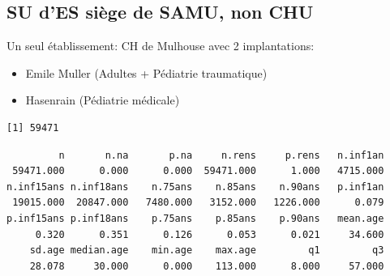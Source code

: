 \documentclass[]{article}
\newenvironment{Shaded}{\begin{snugshade}}{\end{snugshade}}
\newcommand{\KeywordTok}[1]{\textcolor[rgb]{0.13,0.29,0.53}{\textbf{{#1}}}}
\newcommand{\StringTok}[1]{\textcolor[rgb]{0.31,0.60,0.02}{{#1}}}
\newcommand{\CommentTok}[1]{\textcolor[rgb]{0.56,0.35,0.01}{\textit{{#1}}}}
\newcommand{\NormalTok}[1]{{#1}}
\begin{document}
\subsection{SU d'ES siège de SAMU, non
CHU}\label{su-des-siege-de-samu-non-chu}

Un seul établissement: CH de Mulhouse avec 2 implantations:

\begin{itemize}
\itemsep1pt\parskip0pt
\item
  Emile Muller (Adultes + Pédiatrie traumatique)
\item
  Hasenrain (Pédiatrie médicale)
\end{itemize}

\begin{Shaded}
\end{Shaded}

\begin{verbatim}
[1] 59471
\end{verbatim}

\begin{Shaded}
\end{Shaded}

\begin{verbatim}
         n       n.na       p.na     n.rens     p.rens   n.inf1an 
 59471.000      0.000      0.000  59471.000      1.000   4715.000 
n.inf15ans n.inf18ans    n.75ans    n.85ans    n.90ans   p.inf1an 
 19015.000  20847.000   7480.000   3152.000   1226.000      0.079 
p.inf15ans p.inf18ans    p.75ans    p.85ans    p.90ans   mean.age 
     0.320      0.351      0.126      0.053      0.021     34.600 
    sd.age median.age    min.age    max.age         q1         q3 
    28.078     30.000      0.000    113.000      8.000     57.000 
\end{verbatim}

\begin{Shaded}
\end{Shaded}
\end{document}
